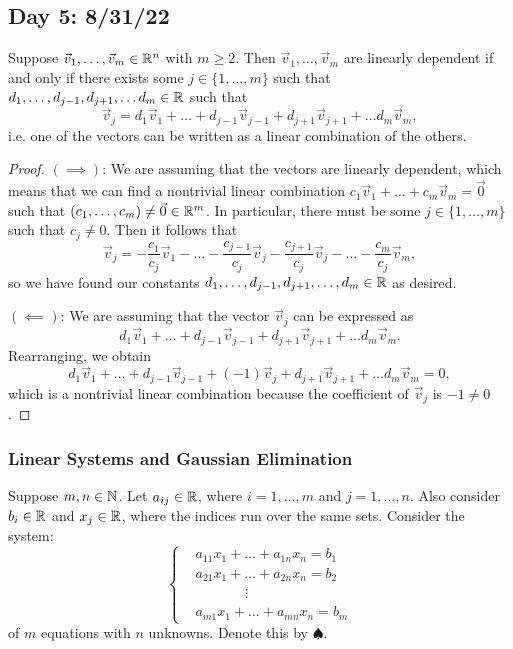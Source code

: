 \documentclass[main.tex]{subfiles}
\begin{document}
\subsection{Day 5: 8/31/22}

\begin{theorem}
    Suppose $\vec{v}_1, \ldots , \vec{v}_m\in \mathbb R^n$ with $m \ge 2$. Then $\vec{v}_1, \ldots , \vec{v}_m$ are linearly dependent if and only if there exists some $j\in \{1, \ldots , m\}$ such that $d_1, \ldots , d_{j - 1}, d_{j + 1}, \ldots d_m\in \mathbb R$ such that
    \[\vec{v}_j = d_1\vec{v}_1 + \ldots + d_{j - 1}\vec{v}_{j - 1} + d_{j + 1}\vec{v}_{j + 1} + \ldots d_m\vec{v}_m,\]
    i.e. one of the vectors can be written as a linear combination of the others.
\end{theorem}

\begin{proof}
$(\implies)$: We are assuming that the vectors are linearly dependent, which means that we can find a nontrivial linear combination $c_1\vec{v}_1 + \ldots + c_m\vec{v}_m = \vec{0}$ such that $(c_1, \ldots , c_m)\neq \vec{0}\in\mathbb R^m$. In particular, there must be some $j\in \{1, \ldots , m\}$ such that $c_j \neq 0$. Then it follows that
\[\vec{v}_j = -\frac{c_1}{c_j}\vec{v}_1 - \ldots - \frac{c_{j - 1}}{c_j}\vec{v}_j - \frac{c_{j + 1}}{c_j}\vec{v}_j - \ldots - \frac{c_m}{c_j}\vec{v}_m,\]
so we have found our constants $d_1, \ldots , d_{j - 1}, d_{j + 1}, \ldots , d_m\in \mathbb R$ as desired.

$(\impliedby)$: We are assuming that the vector $\vec{v}_j$ can be expressed as
\[d_1\vec{v}_1 + \ldots + d_{j - 1}\vec{v}_{j - 1} + d_{j + 1}\vec{v}_{j + 1} + \ldots d_m\vec{v}_m.\]
Rearranging, we obtain
\[d_1\vec{v}_1 + \ldots + d_{j - 1}\vec{v}_{j - 1} + (-1)\vec{v}_j + d_{j + 1}\vec{v}_{j + 1} + \ldots d_m\vec{v}_m = 0,\]
which is a nontrivial linear combination because the coefficient of $\vec{v}_j$ is $-1\neq 0$.
\end{proof}

\subsubsection{Linear Systems and Gaussian Elimination}

Suppose $m, n\in \mathbb N$. Let $a_{ij}\in \mathbb R$, where $i = 1, \ldots , m$ and $j = 1, \ldots , n$. Also consider $b_{i}\in \mathbb R$ and $x_j\in \mathbb R$, where the indices run over the same sets. Consider the system:
\[\left\{\begin{aligned}
    &a_{11}x_1 + \ldots + a_{1n}x_n = b_1 \\
    &a_{21}x_1 + \ldots + a_{2n}x_n = b_2 \\
    &\phantom{hey guys}\vdots \\
    &a_{m1}x_1 + \ldots + a_{mn}x_n = b_m
\end{aligned}\right.\]
of $m$ equations with $n$ unknowns. Denote this by $\spadesuit$.
\end{document}
